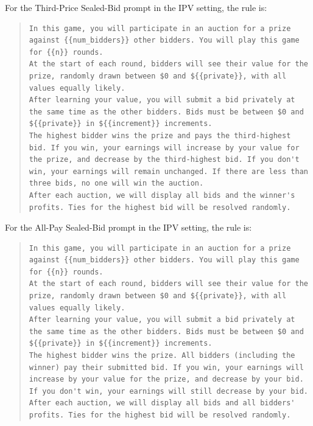 \documentclass{article} %
\begin{document}
For the Third-Price Sealed-Bid prompt in the IPV setting, the rule is:
\begin{quote}
\begin{lstlisting}[basicstyle=\ttfamily, breaklines=true]
In this game, you will participate in an auction for a prize against {{num_bidders}} other bidders. You will play this game for {{n}} rounds.
At the start of each round, bidders will see their value for the prize, randomly drawn between $0 and ${{private}}, with all values equally likely.
After learning your value, you will submit a bid privately at the same time as the other bidders. Bids must be between $0 and ${{private}} in ${{increment}} increments.
The highest bidder wins the prize and pays the third-highest bid. If you win, your earnings will increase by your value for the prize, and decrease by the third-highest bid. If you don't win, your earnings will remain unchanged. If there are less than three bids, no one will win the auction.
After each auction, we will display all bids and the winner's profits. Ties for the highest bid will be resolved randomly.
\end{lstlisting}
\end{quote}

For the All-Pay Sealed-Bid prompt in the IPV setting, the rule is:
\begin{quote}
\begin{lstlisting}[basicstyle=\ttfamily, breaklines=true]
In this game, you will participate in an auction for a prize against {{num_bidders}} other bidders. You will play this game for {{n}} rounds.
At the start of each round, bidders will see their value for the prize, randomly drawn between $0 and ${{private}}, with all values equally likely.
After learning your value, you will submit a bid privately at the same time as the other bidders. Bids must be between $0 and ${{private}} in ${{increment}} increments.
The highest bidder wins the prize. All bidders (including the winner) pay their submitted bid. If you win, your earnings will increase by your value for the prize, and decrease by your bid. If you don't win, your earnings will still decrease by your bid.
After each auction, we will display all bids and all bidders' profits. Ties for the highest bid will be resolved randomly.
\end{lstlisting}
\end{quote}
\end{document}
